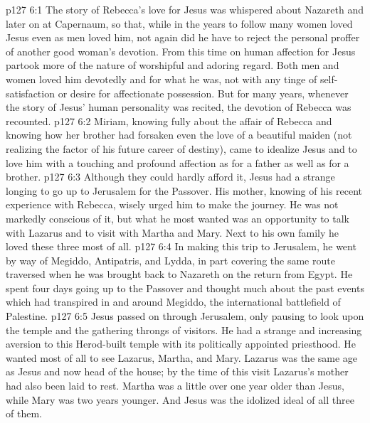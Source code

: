 \vs p127 6:1 The story of Rebecca’s love for Jesus was whispered about Nazareth and later on at Capernaum, so that, while in the years to follow many women loved Jesus even as men loved him, not again did he have to reject the personal proffer of another good woman’s devotion. From this time on human affection for Jesus partook more of the nature of worshipful and adoring regard. Both men and women loved him devotedly and for what he was, not with any tinge of self\hyp{}satisfaction or desire for affectionate possession. But for many years, whenever the story of Jesus’ human personality was recited, the devotion of Rebecca was recounted.
\vs p127 6:2 Miriam, knowing fully about the affair of Rebecca and knowing how her brother had forsaken even the love of a beautiful maiden (not realizing the factor of his future career of destiny), came to idealize Jesus and to love him with a touching and profound affection as for a father as well as for a brother.
\pc \vs p127 6:3 Although they could hardly afford it, Jesus had a strange longing to go up to Jerusalem for the Passover. His mother, knowing of his recent experience with Rebecca, wisely urged him to make the journey. He was not markedly conscious of it, but what he most wanted was an opportunity to talk with Lazarus and to visit with Martha and Mary. Next to his own family he loved these three most of all.
\vs p127 6:4 In making this trip to Jerusalem, he went by way of Megiddo, Antipatris, and Lydda, in part covering the same route traversed when he was brought back to Nazareth on the return from Egypt. He spent four days going up to the Passover and thought much about the past events which had transpired in and around Megiddo, the international battlefield of Palestine.
\vs p127 6:5 Jesus passed on through Jerusalem, only pausing to look upon the temple and the gathering throngs of visitors. He had a strange and increasing aversion to this Herod\hyp{}built temple with its politically appointed priesthood. He wanted most of all to see Lazarus, Martha, and Mary. Lazarus was the same age as Jesus and now head of the house; by the time of this visit Lazarus’s mother had also been laid to rest. Martha was a little over one year older than Jesus, while Mary was two years younger. And Jesus was the idolized ideal of all three of them.
